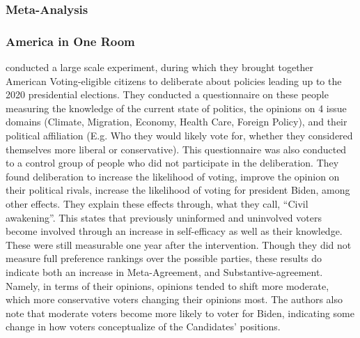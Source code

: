 \subsubsection{Meta-Analysis}

\subsubsection{America in One Room}\label{sub:americainonroom} \citet{fishkinCanDeliberationHave2024}
conducted a large scale experiment, during which they brought together American
Voting-eligible citizens to deliberate about policies leading up to the 2020
presidential elections. They conducted a questionnaire on these people
measuring the knowledge of the current state of politics, the opinions on 4
issue domains (Climate, Migration, Economy, Health Care, Foreign Policy), and
their political affiliation (E.g. Who they would likely vote for, whether they
considered themselves more liberal or conservative). This questionnaire was
also conducted to a control group of people who did not participate in the
deliberation. They found deliberation to increase the likelihood of voting,
improve the opinion on their political rivals, increase the likelihood of
voting for president Biden, among other effects. They explain these effects
through, what they call, ``Civil awakening''. This states that previously
uninformed and uninvolved voters become involved through an increase in
self-efficacy as well as their knowledge. These were still measurable one year
after the intervention. Though they did not measure full preference rankings
over the possible parties, these results do indicate both an increase in
Meta-Agreement, and Substantive-agreement. Namely, in terms of their opinions,
opinions tended to shift more moderate, which more conservative voters changing
their opinions most. The authors also note that moderate voters become more
likely to voter for Biden, indicating some change in how voters conceptualize
of the Candidates' positions.


